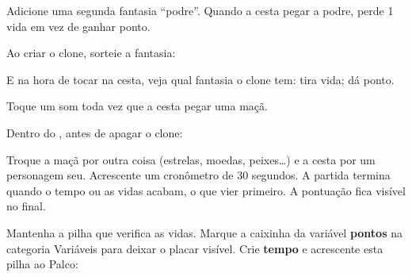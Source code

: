 \begin{exercicio}
Adicione uma segunda fantasia ``podre''. Quando a cesta pegar a podre, perde 1 vida em vez de ganhar ponto.
\end{exercicio}

\begin{solucao}
Ao criar o clone, sorteie a fantasia:
\begin{pilha}
\end{pilha}
E na hora de tocar na cesta, veja qual fantasia o clone tem:  tira vida;  dá ponto.
\end{solucao}

\begin{exercicio}
Toque um som toda vez que a cesta pegar uma maçã.
\end{exercicio}

\begin{solucao}
Dentro do , antes de apagar o clone:
\begin{pilha}
\end{pilha}
\end{solucao}

\begin{desafio}
Troque a maçã por outra coisa (estrelas, moedas, peixes\ldots) e a cesta por um personagem seu. Acrescente um cronômetro de 30 segundos. A partida termina quando o tempo ou as vidas acabam, o que vier primeiro. A pontuação fica visível no final.
\end{desafio}

\begin{solucao}
Mantenha a pilha que verifica as vidas. Marque a caixinha da variável \textbf{pontos} na categoria Variáveis para deixar o placar visível. Crie \textbf{tempo} e acrescente esta pilha ao Palco:
\begin{pilha}
\sbcend
{}
\end{pilha}
\end{solucao}
